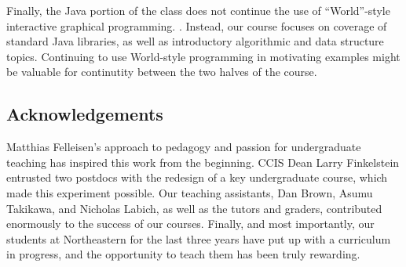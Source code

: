 \documentclass[submission,copyright]{eptcs}
\begin{document}
Finally, the Java portion of the class does not continue the use of
``World''-style interactive graphical
programming. \citet{local:java-world}.  Instead, our course focuses on
coverage of standard Java libraries, as well as introductory
algorithmic and data structure topics.  Continuing to use World-style
programming in motivating examples might be valuable for continutity
between the two halves of the course.

\subsection*{Acknowledgements}

Matthias Felleisen's approach to pedagogy and passion for
undergraduate teaching has inspired this work from the beginning.
CCIS Dean Larry Finkelstein entrusted two postdocs with the redesign
of a key undergraduate course, which made this experiment possible.
Our teaching assistants, Dan Brown, Asumu Takikawa, and Nicholas
Labich, as well as the tutors and graders, contributed enormously to
the success of our courses. Finally, and most importantly, our
students at Northeastern for the last three years have put up with a
curriculum in progress, and the opportunity to teach them has been
truly rewarding.



\end{document}
